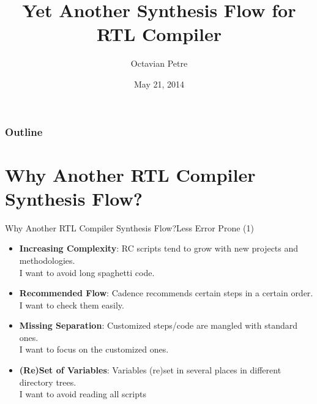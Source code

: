 \documentclass{beamer}
\title[Synthesis Flow]{Yet Another Synthesis Flow for RTL Compiler}
\author{Octavian Petre}
\institute{NXP Semiconductors}
\date{May 21, 2014}
\begin{document}
\setcounter{tocdepth}{1}


% 

\begin{frame}[plain]
\titlepage 
\end{frame}



\begin{frame}
	\frametitle{Outline}
	\tableofcontents
\end{frame}

\section{Why Another RTL Compiler Synthesis Flow?}
\begin{frame}{Why Another RTL Compiler Synthesis Flow?}{Less Error Prone (1)}
	\begin{itemize}[<+->]
	\item \textbf{Increasing Complexity}: RC scripts tend to grow with new projects and methodologies. \\ \alert{I want to avoid long spaghetti code.}
	\item \textbf{Recommended Flow}: Cadence recommends certain steps in a certain order. \\ \alert{I want to check them easily.}
	\item \textbf{Missing Separation}: Customized steps/code are mangled with standard ones.\\ \alert{I want to focus on the customized ones.}
	\item \textbf{(Re)Set of Variables}: Variables (re)set in several places in different directory trees.\\ \alert{I want to avoid reading all scripts} 
	\end{itemize}
\end{frame}
\end{document}
